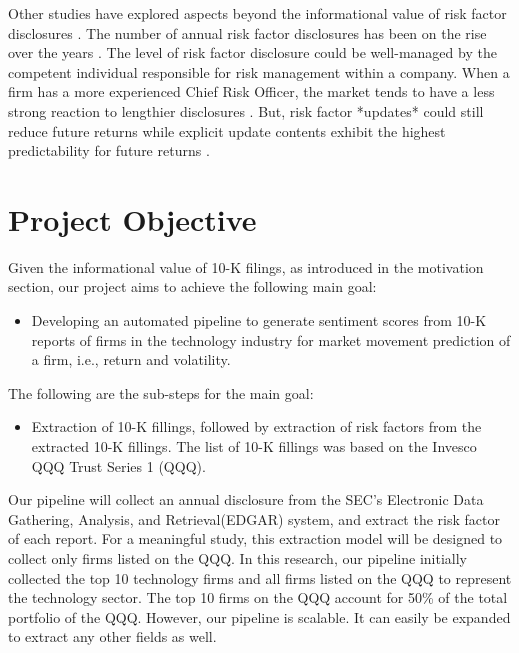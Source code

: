 \documentclass[logo,bsc,singlespacing,parskip]{infthesis}
\begin{document}
Other studies have explored aspects beyond the informational value of risk factor disclosures \cite{ beattychengzhang2015, baileyfilzen2016, filzenmcbrayershannon2016}. The number of annual risk factor disclosures has been on the rise over the years \cite{beattychengzhang2015}. The level of risk factor disclosure could be well-managed by the competent individual responsible for risk management within a company. When a firm has a more experienced Chief Risk Officer, the market tends to have a less strong reaction to lengthier disclosures \cite{baileyfilzen2016}. But, risk factor *updates* could still reduce future returns while explicit update contents exhibit the highest predictability for future returns \cite{filzenmcbrayershannon2016}.


\section{Project Objective}
Given the informational value of 10-K filings, as introduced in the motivation section, our project aims to achieve the following main goal:

\begin{itemize}
    \item Developing an automated pipeline to generate sentiment scores from 10-K reports of firms in the technology industry for market movement prediction of a firm, i.e., return and volatility.
\end{itemize}

The following are the sub-steps for the main goal:

\begin{itemize}
    \item Extraction of 10-K fillings, followed by extraction of risk factors from the extracted 10-K fillings. The list of 10-K fillings was based on the Invesco QQQ Trust Series 1 (QQQ).
\end{itemize}

Our pipeline will collect an annual disclosure from the SEC’s Electronic Data Gathering, Analysis, and Retrieval(EDGAR) system, and extract the risk factor of each report. For a meaningful study, this extraction model will be designed to collect only firms listed on the QQQ. In this research, our pipeline initially collected the top 10 technology firms and all firms listed on the QQQ to represent the technology sector. The top 10 firms on the QQQ account for 50\% of the total portfolio of the QQQ. However, our pipeline is scalable. It can easily be expanded to extract any other fields as well.
\end{document}
